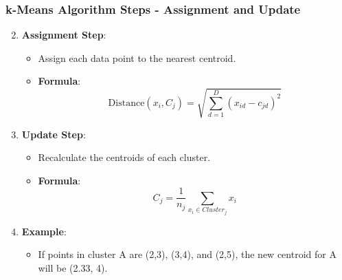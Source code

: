 \documentclass[aspectratio=169]{beamer}
\begin{document}
\begin{frame}[fragile]
    \frametitle{k-Means Algorithm Steps - Assignment and Update}
    \begin{enumerate}
        \setcounter{enumi}{1}
        \item \textbf{Assignment Step}:
        \begin{itemize}
            \item Assign each data point to the nearest centroid.
            \item \textbf{Formula}:
            \begin{equation}
                \text{Distance}(x_i, C_j) = \sqrt{\sum_{d=1}^{D} (x_{id} - c_{jd})^2}
            \end{equation}
        \end{itemize}
        
        \item \textbf{Update Step}:
        \begin{itemize}
            \item Recalculate the centroids of each cluster.
            \item \textbf{Formula}:
            \begin{equation}
                C_j = \frac{1}{n_j} \sum_{x_i \in Cluster_j} x_i
            \end{equation}
        \end{itemize}
        
        \item \textbf{Example}:
        \begin{itemize}
            \item If points in cluster A are (2,3), (3,4), and (2,5), the new centroid for A will be (2.33, 4).
        \end{itemize}
    \end{enumerate}
\end{frame}
\end{document}
